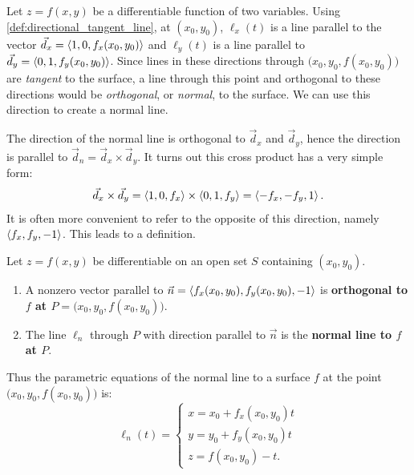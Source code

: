 Let $z=f(x,y)$ be a differentiable function of two variables. Using \autoref{def:directional_tangent_line}, at $(x_0,y_0)$, $\ell_x(t)$ is a line parallel to the vector $\vec d_x=\left\langle 1,0,f_x(x_0,y_0)\right\rangle$ and $\ell_y(t)$ is a line parallel to $\vec d_y=\left\langle 0,1,f_y(x_0,y_0)\right\rangle$. Since lines in these directions through $\bigl(x_0,y_0,f(x_0,y_0)\bigr)$ are \emph{tangent} to the surface, a line through this point and orthogonal to these directions would be \emph{orthogonal}, or \emph{normal}, to the surface. We can use this direction to create a normal line.

The direction of the normal line is orthogonal to $\vec d_x$ and $\vec d_y$, hence the direction is parallel to $\vec d_n = \vec d_x\times \vec d_y$. It turns out this cross product has a very simple form:
\[ \vec d_x\times \vec d_y =\left\langle 1,0,f_x\right\rangle\times\left\langle 0,1,f_y\right\rangle=\left\langle -f_x,-f_y,1\right\rangle.\]
It is often more convenient to refer to the opposite of this direction, namely $\left\langle f_x,f_y,-1\right\rangle$. This leads to a definition.


\begin{definition}\label{def:normal_line_space}%
Let $z=f(x,y)$ be differentiable on an open set $S$ containing $(x_0,y_0)$.

\begin{enumerate}
\item	A nonzero vector parallel to $\vec n=\left\langle f_x(x_0,y_0),f_y(x_0,y_0),-1\right\rangle$ is \textbf{orthogonal to $f$ at $P=\bigl(x_0,y_0,f(x_0,y_0)\bigr)$}.

\item The line $\ell_n$ through $P$ with direction parallel to $\vec n$ is the \textbf{normal line to $f$ at $P$}.
\end{enumerate}
\end{definition}

Thus the parametric equations of the normal line to a surface $f$ at the point $\bigl(x_0,y_0,f(x_0,y_0)\bigr)$ is:
\[
\ell_{n}(t) =
\begin{cases}
x = x_0 + f_x(x_0,y_0)t \\
y = y_0 + f_y(x_0,y_0)t \\
z = f(x_0,y_0) - t.
\end{cases}
\]

